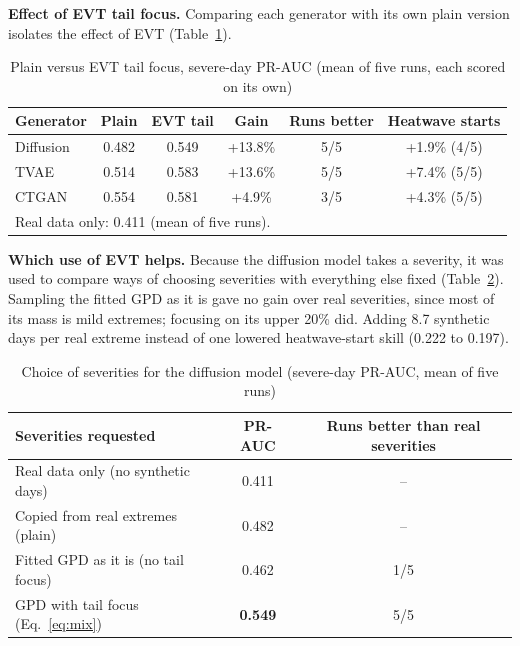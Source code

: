 \documentclass[12pt,a4paper]{report}
\begin{document}
\textbf{Effect of EVT tail focus.} Comparing each generator with its own plain version isolates the effect
of EVT (Table~\ref{tab:evtgain}).

\begin{table}[H]
\centering
\caption{Plain versus EVT tail focus, severe-day PR-AUC (mean of five runs, each scored on its own)}
\label{tab:evtgain}
\small
\begin{tabular}{|l|c|c|c|c|c|}
\hline
\textbf{Generator} & \textbf{Plain} & \textbf{EVT tail} & \textbf{Gain} & \textbf{Runs better} & \textbf{Heatwave starts}\\ \hline
Diffusion & 0.482 & 0.549 & +13.8\% & 5/5 & +1.9\% (4/5)\\ \hline
TVAE & 0.514 & 0.583 & +13.6\% & 5/5 & +7.4\% (5/5)\\ \hline
CTGAN & 0.554 & 0.581 & +4.9\% & 3/5 & +4.3\% (5/5)\\ \hline
\multicolumn{6}{|l|}{Real data only: 0.411 (mean of five runs).}\\ \hline
\end{tabular}
\end{table}

\textbf{Which use of EVT helps.} Because the diffusion model takes a severity, it was used to compare ways of choosing
severities with everything else fixed (Table~\ref{tab:ablation}). Sampling the fitted GPD as it is gave no gain over
real severities, since most of its mass is mild extremes; focusing on its upper 20\% did. Adding 8.7 synthetic days per
real extreme instead of one lowered heatwave-start skill (0.222 to 0.197).

\begin{table}[H]
\centering
\caption{Choice of severities for the diffusion model (severe-day PR-AUC, mean of five runs)}
\label{tab:ablation}
\small
\begin{tabular}{|l|c|c|}
\hline
\textbf{Severities requested} & \textbf{PR-AUC} & \textbf{Runs better than real severities}\\ \hline
Real data only (no synthetic days) & 0.411 & --\\ \hline
Copied from real extremes (plain) & 0.482 & --\\ \hline
Fitted GPD as it is (no tail focus) & 0.462 & 1/5\\ \hline
\rowcolor{rowhl}GPD with tail focus (Eq.~\ref{eq:mix}) & \textbf{0.549} & 5/5\\ \hline
\end{tabular}
\end{table}
\end{document}
